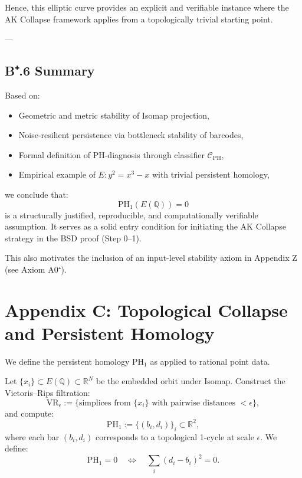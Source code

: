 Hence, this elliptic curve provides an explicit and verifiable instance  
where the AK Collapse framework applies from a topologically trivial starting point.

---

\subsection*{B⁺.6 Summary}

Based on:
\begin{itemize}
  \item Geometric and metric stability of Isomap projection,
  \item Noise-resilient persistence via bottleneck stability of barcodes,
  \item Formal definition of PH-diagnosis through classifier \( \mathcal{C}_{\mathrm{PH}} \),
  \item Empirical example of \( E: y^2 = x^3 - x \) with trivial persistent homology,
\end{itemize}

we conclude that:
\[
\mathrm{PH}_1(E(\mathbb{Q})) = 0
\]
is a structurally justified, reproducible, and computationally verifiable assumption.  
It serves as a solid entry condition for initiating the AK Collapse strategy in the BSD proof (Step 0–1).

This also motivates the inclusion of an input-level stability axiom in Appendix Z (see Axiom A0⁺).



\section*{Appendix C: Topological Collapse and Persistent Homology}

We define the persistent homology \( \mathrm{PH}_1 \) as applied to rational point data.

Let \( \{x_i\} \subset E(\mathbb{Q}) \subset \mathbb{R}^N \) be the embedded orbit under Isomap.  
Construct the Vietoris–Rips filtration:
\[
\mathrm{VR}_\epsilon := \{ \text{simplices from } \{x_i\} \text{ with pairwise distances } < \epsilon \},
\]
and compute:
\[
\mathrm{PH}_1 := \{ (b_i, d_i) \}_{i} \subset \mathbb{R}^2,
\]
where each bar \( (b_i, d_i) \) corresponds to a topological 1-cycle at scale \( \epsilon \).  
We define:
\[
\mathrm{PH}_1 = 0 \quad \Leftrightarrow \quad \sum_i (d_i - b_i)^2 = 0.
\]

